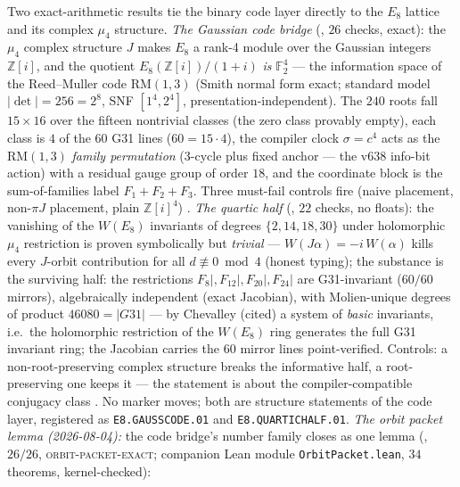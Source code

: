 \documentclass[11pt,a4paper]{article}
\theoremstyle{definition}
\begin{document}
\begin{keybox}
Two exact-arithmetic results tie the binary code layer directly to
the $E_8$ lattice and its complex $\mu_4$ structure.  \emph{The
Gaussian code bridge} (, $26$
checks, exact): the $\mu_4$ complex structure $J$ makes $E_8$ a
rank-4 module over the Gaussian integers $\mathbb{Z}[i]$, and the
quotient $E_8(\mathbb{Z}[i])/(1+i)$ \emph{is} $\mathbb{F}_2^4$ ---
the information space of the Reed--Muller code $\mathrm{RM}(1,3)$
(Smith normal form exact; standard model $|\det|=256=2^8$, SNF
$[1^4,2^4]$, presentation-independent).  The $240$ roots fall
$15\times16$ over the fifteen nontrivial classes (the zero class
provably empty), each class is $4$ of the $60$ G31 lines
($60=15\cdot4$), the compiler clock $\sigma=c^4$ acts as the
$\mathrm{RM}(1,3)$ \emph{family permutation} (3-cycle plus fixed
anchor --- the v638 info-bit action) with a residual gauge group of
order $18$, and the coordinate block is the sum-of-families label
$F_1{+}F_2{+}F_3$.  Three must-fail controls fire (naive placement,
non-$\pi J$ placement, plain $\mathbb{Z}[i]^4$) \mE.  \emph{The
quartic half} (, $22$ checks, no
floats): the vanishing of the $W(E_8)$ invariants of degrees
$\{2,14,18,30\}$ under holomorphic $\mu_4$ restriction is proven
symbolically but \emph{trivial} --- $W(J\alpha)=-i\,W(\alpha)$ kills
every $J$-orbit contribution for all $d\not\equiv0\bmod4$ (honest
typing); the substance is the surviving half: the restrictions
$F_8|,F_{12}|,F_{20}|,F_{24}|$ are G31-invariant ($60/60$ mirrors),
algebraically independent (exact Jacobian), with Molien-unique
degrees of product $46080=|G31|$ --- by Chevalley (cited) a system
of \emph{basic} invariants, i.e.\ the holomorphic restriction of
the $W(E_8)$ ring generates the full G31 invariant ring; the
Jacobian carries the $60$ mirror lines point-verified.  Controls: a
non-root-preserving complex structure breaks the informative half,
a root-preserving one keeps it --- the statement is about the
compiler-compatible conjugacy class \mE.  No marker moves; both are
structure statements of the code layer, registered as
\texttt{E8.GAUSSCODE.01} and \texttt{E8.QUARTICHALF.01}.
\emph{The orbit packet lemma (2026-08-04):} the code bridge's number
family closes as one lemma (, $26/26$,
\textsc{orbit-packet-exact}; companion Lean module
\texttt{OrbitPacket.lean}, $34$ theorems, kernel-checked):
\begin{center}

\end{center}
\end{keybox}
\end{document}
